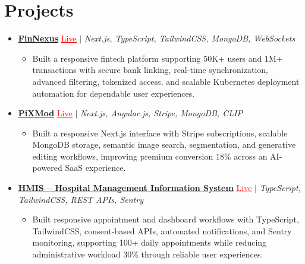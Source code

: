 \documentclass[letterpaper,10pt]{article}
\newcommand{\itemTail}{\vspace{-5pt}}
\newcommand{\projGap}{\vspace{3pt}}
\newcommand{\resumeItem}[1]{\item\small{{#1 \itemTail}}}
\newcommand{\resumeProjectHeading}[1]{\item \small #1 \vspace{-2pt}}
\newcommand{\resumeProjectLink}[2]{\href{#1}{\textcolor{red}{\underline{#2}}}}
\newcommand{\resumeSubHeadingListStart}{\begin{itemize}[leftmargin=0.0in, label={}]}
\newcommand{\resumeSubHeadingListEnd}{\end{itemize}}
\newcommand{\resumeProjItemListStart}{\begin{itemize}[leftmargin=0.15in,label=\textbullet,itemsep=3pt,topsep=0pt,parsep=0pt,partopsep=0pt]}
\newcommand{\resumeProjItemListEnd}{\end{itemize}\vspace{-4pt}}
\begin{document}
\section{Projects}
\resumeSubHeadingListStart
\vspace{-2pt}
\resumeProjectHeading{\href{https://fin-nexus.vercel.app/}{\textbf{FinNexus}} \resumeProjectLink{https://fin-nexus.vercel.app/}{Live} $|$ \emph{Next.js, TypeScript, TailwindCSS, MongoDB, WebSockets}}
\resumeProjItemListStart
\resumeItem{Built a responsive fintech platform supporting 50K+ users and 1M+ transactions with secure bank linking, real-time synchronization, advanced filtering, tokenized access, and scalable Kubernetes deployment automation for dependable user experiences.}
\resumeProjItemListEnd
\projGap
\resumeProjectHeading{\href{https://pixmod.vercel.app/}{\textbf{PiXMod}} \resumeProjectLink{https://pixmod.vercel.app/}{Live} $|$ \emph{Next.js, Angular.js, Stripe, MongoDB, CLIP}}
\resumeProjItemListStart
\resumeItem{Built a responsive Next.js interface with Stripe subscriptions, scalable MongoDB storage, semantic image search, segmentation, and generative editing workflows, improving premium conversion 18\% across an AI-powered SaaS experience.}
\resumeProjItemListEnd
\projGap
\resumeProjectHeading{\href{https://hims-rouge.vercel.app/}{\textbf{HMIS -- Hospital Management Information System}} \resumeProjectLink{https://hims-rouge.vercel.app/}{Live} $|$ \emph{TypeScript, TailwindCSS, REST APIs, Sentry}}
\resumeProjItemListStart
\resumeItem{Built responsive appointment and dashboard workflows with TypeScript, TailwindCSS, consent-based APIs, automated notifications, and Sentry monitoring, supporting 100+ daily appointments while reducing administrative workload 30\% through reliable user experiences.}
\resumeProjItemListEnd
\resumeSubHeadingListEnd
\end{document}
